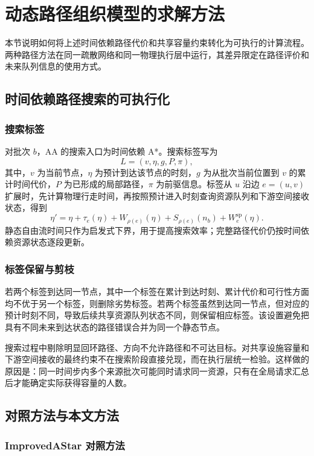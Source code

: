 \documentclass[UTF8,a4paper,12pt]{ctexart}
\begin{document}
\section{动态路径组织模型的求解方法}

本节说明如何将上述时间依赖路径代价和共享容量约束转化为可执行的计算流程。两种路径方法在同一疏散网络和同一物理执行层中运行，其差异限定在路径评价和未来队列信息的使用方式。

\subsection{时间依赖路径搜索的可执行化}

\subsubsection{搜索标签}

对批次 \(b\)，AA 的搜索入口为时间依赖 A*。搜索标签写为
\[
L=(v,\eta,g,P,\pi),
\]
其中，\(v\) 为当前节点，\(\eta\) 为预计到达该节点的时刻，\(g\) 为从批次当前位置到 \(v\) 的累计时间代价，\(P\) 为已形成的局部路径，\(\pi\) 为前驱信息。标签从 \(u\) 沿边 \(e=(u,v)\) 扩展时，先计算物理行走时间，再按照预计进入时刻查询资源队列和下游空间接收状态，得到
\[
\eta'=\eta+\tau_e(\eta)+W_{\rho(e)}(\eta)+S_{\rho(e)}(n_b)+W^{\mathrm{sp}}_e(\eta).
\]
静态自由流时间只作为启发式下界，用于提高搜索效率；完整路径代价仍按时间依赖资源状态逐段更新。

\subsubsection{标签保留与剪枝}

若两个标签到达同一节点，其中一个标签在累计到达时刻、累计代价和可行性方面均不优于另一个标签，则删除劣势标签。若两个标签虽然到达同一节点，但对应的预计时刻不同，导致后续共享资源队列状态不同，则保留相应标签。该设置避免把具有不同未来到达状态的路径错误合并为同一个静态节点。

搜索过程中剔除明显回环路径、方向不允许路径和不可达目标。对共享设施容量和下游空间接收的最终约束不在搜索阶段直接兑现，而在执行层统一检验。这样做的原因是：同一时间步内多个来源批次可能同时请求同一资源，只有在全局请求汇总后才能确定实际获得容量的人数。

\subsection{对照方法与本文方法}

\subsubsection{ImprovedAStar 对照方法}
\end{document}
